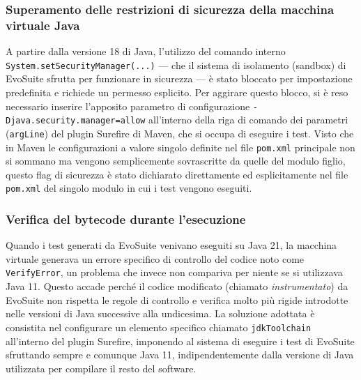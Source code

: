 \subsubsection{Superamento delle restrizioni di sicurezza della macchina virtuale Java}
A partire dalla versione 18 di Java, l'utilizzo del comando interno 
\texttt{System.setSecurityManager(...)} — che il sistema di isolamento (sandbox) 
di EvoSuite sfrutta per funzionare in sicurezza — è stato bloccato per impostazione 
predefinita e richiede un permesso esplicito. 
Per aggirare questo blocco, si è reso necessario inserire l'apposito parametro 
di configurazione \texttt{-Djava.security.manager=allow} all'interno della riga di comando 
dei parametri (\texttt{argLine}) del plugin Surefire di Maven, che si occupa di eseguire i test. 
Visto che in Maven le configurazioni a valore singolo definite nel file \texttt{pom.xml} principale 
non si sommano ma vengono semplicemente sovrascritte da quelle del modulo figlio, 
questo flag di sicurezza è stato dichiarato direttamente ed esplicitamente 
nel file \texttt{pom.xml} del singolo modulo in cui i test vengono eseguiti.

\subsubsection{Verifica del bytecode durante l'esecuzione}
Quando i test generati da EvoSuite venivano eseguiti su Java 21, la macchina virtuale 
generava un errore specifico di controllo del codice noto come \texttt{VerifyError}, 
un problema che invece non compariva per niente se si utilizzava Java 11. 
Questo accade perché il codice modificato (chiamato \textit{instrumentato}) da EvoSuite 
non rispetta le regole di controllo e verifica molto più rigide introdotte nelle versioni di Java successive alla undicesima. 
La soluzione adottata è consistita nel configurare un elemento specifico chiamato \texttt{jdkToolchain} 
all'interno del plugin Surefire, imponendo al sistema di eseguire i test di EvoSuite 
sfruttando sempre e comunque Java 11, indipendentemente dalla versione di Java 
utilizzata per compilare il resto del software.

